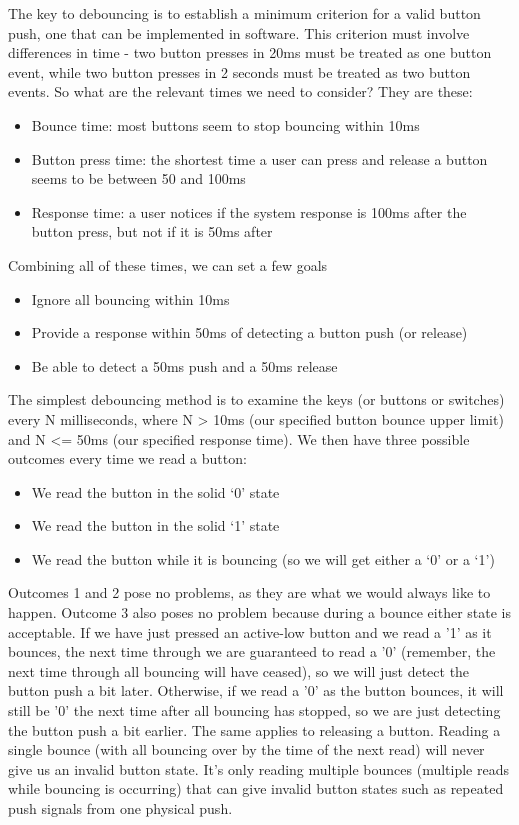 The key to debouncing is to establish a minimum criterion for a valid button push, one that can be implemented in software.  This criterion must involve differences in time - two button presses in 20ms must be treated as one button event, while two button presses in 2 seconds must be treated as two button events.  So what are the relevant times we need to consider?  They are these:
\begin{itemize}
    \item Bounce time:  most buttons seem to stop bouncing within 10ms
    \item Button press time: the shortest time a user can press and release a button seems to be between 50 and 100ms
    \item Response time: a user notices if the system response is 100ms after the button press, but not if it is 50ms after
\end{itemize}



Combining all of these times, we can set a few goals
\begin{itemize}
    \item Ignore all bouncing within 10ms
    \item Provide a response within 50ms of detecting a button push (or release)
    \item Be able to detect a 50ms push and a 50ms release    
\end{itemize}


The simplest debouncing method is to examine the keys (or buttons or switches) every N milliseconds, where N > 10ms (our specified button bounce upper limit) and N <= 50ms (our specified response time).   We then have three possible outcomes every time we read a button:
\begin{itemize}
    \item We read the button in the solid `0' state
    \item We read the button in the solid `1' state
    \item We read the button while it is bouncing (so we will get either a `0' or a `1')
\end{itemize}

Outcomes 1 and 2 pose no problems, as they are what we would always like to happen.  Outcome 3 also poses no problem because during a bounce either state is acceptable.  If we have just pressed an active-low button and we read a '1' as it bounces, the next time through we are guaranteed to read a '0' (remember, the next time through all bouncing will have ceased), so we will just detect the button push a bit later.  Otherwise, if we read a '0' as the button bounces, it will still be '0' the next time after all bouncing has stopped, so we are just detecting the button push a bit earlier.  The same applies to releasing a button.  Reading a single bounce (with all bouncing over by the time of the next read) will never give us an invalid button state.  It's only reading multiple bounces (multiple reads while bouncing is occurring) that can give invalid button states such as repeated push signals from one physical push. 

